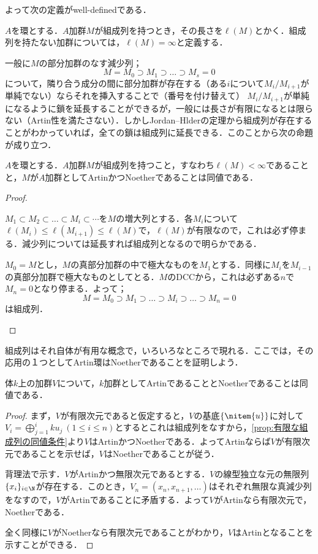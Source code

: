 よって次の定義がwell-definedである．

\begin{defi}[組成列の長さ]
	$A$を環とする．$A$加群$M$が組成列を持つとき，その長さを$\ell(M)$とかく．組成列を持たない加群については，$\ell(M)=\infty$と定義する．
\end{defi}
一般に$M$の部分加群のなす減少列；
\[M=M_0\supset M_1\supset\dots\supset M_s=0\]
について，隣り合う成分の間に部分加群が存在する（ある$i$について$M_i/M_{i+1}$が単純でない）ならそれを挿入することで（番号を付け替えて）
$M_i/M_{i+1}$が単純になるように鎖を延長することができるが，一般には長さが有限になるとは限らない（Artin性を満たさない）．しかしJordan--Hlderの定理から組成列が存在することがわかっていれば，全ての鎖は組成列に延長できる．このことから次の命題が成り立つ．

\begin{prop}\label{prop:有限な組成列の同値条件}
	$A$を環とする．$A$加群$M$が組成列を持つこと，すなわち$\ell(M)<\infty$であることと，$M$が$A$加群としてArtinかつNoetherであることは同値である．
\end{prop}
\begin{proof}
	\begin{eqv}
		\item 
		$M_1\subset M_2\subset\dots\subset M_i\subset\cdots$を$M$の増大列とする．各$M_i$について$\ell(M_i)\leq\ell(M_{i+1})\leq\ell(M)$で，$\ell(M)$が有限なので，これは必ず停まる．減少列については延長すれば組成列となるので明らかである．
		\item 
		$M_0=M$とし，$M$の真部分加群の中で極大なものを$M_1$とする．同様に$M_i$を$M_{i-1}$の真部分加群で極大なものとしてとる．$M$のDCCから，これは必ずある$n$で$M_n=0$となり停まる．よって；
		\[M=M_0\supset M_1\supset\dots\supset M_i\supset\dots\supset M_n=0\]
		は組成列．
	\end{eqv}
\end{proof}

組成列はそれ自体が有用な概念で，いろいろなところで現れる．ここでは，その応用の１つとしてArtin環はNoetherであることを証明しよう．

\begin{prop}\label{prop:Artinなベクトル空間はNoether}
	体$k$上の加群$V$について，$k$加群としてArtinであることとNoetherであることは同値である．
\end{prop}
\begin{proof}
	まず，$V$が有限次元であると仮定すると，$V$の基底$\{\nitem{u}\}$に対して$V_i=\bigoplus_{j=1}^i ku_j~(1\leq i\leq n)$とするとこれは組成列をなすから，\ref{prop:有限な組成列の同値条件}より$V$はArtinかつNoetherである．よってArtinならば$V$が有限次元であることを示せば，$V$はNoetherであることが従う．
	
	背理法で示す．$V$がArtinかつ無限次元であるとする．$V$の線型独立な元の無限列$\{x_i\}_{i\in\N}$が存在する．このとき，$V_n=(x_n,x_{n+1},\dots)$はそれぞれ無限な真減少列をなすので，$V$がArtinであることに矛盾する．よって$V$がArtinなら有限次元で，Noetherである．
	
	全く同様に$V$がNoetherなら有限次元であることがわかり，$V$はArtinとなることを示すことができる．
\end{proof}

